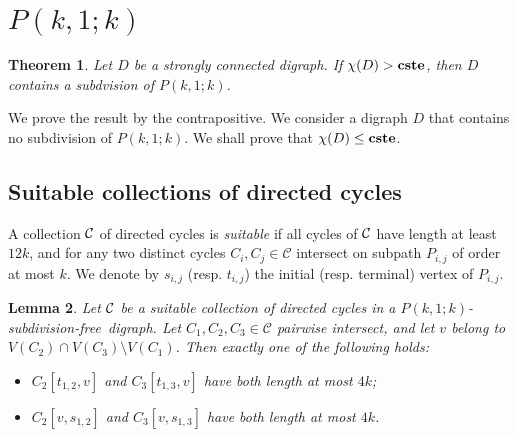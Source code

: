 \documentclass[utf8,10pt]{article}
\theoremstyle{plain}
\newtheorem{theorem}{Theorem}
\newtheorem{lemma}[theorem]{Lemma}
\theoremstyle{definition}
\theoremstyle{remark}
\newcommand{\cste}{\bf cste}
\newcommand{\free}{subdivision-free}
\begin{document}
\section{$P(k,1;k)$}

\begin{theorem}\label{th:main}
Let $D$ be a strongly connected digraph. If $\chi(D) > \cste$, then $D$ contains a subdvision of $P(k,1;k)$.
\end{theorem}


We prove the result by the contrapositive. We consider a digraph $D$ that contains no subdivision of $P(k,1;k)$.
We shall prove that $\chi(D) \leq \cste$.

\subsection{Suitable collections of directed cycles}
 
 A collection ${\cal C}$ of directed cycles is {\it suitable} if all cycles of ${\cal C}$ have length at least $12k$, and for
any two distinct cycles $C_i,C_j\in\mathcal C$ intersect on  subpath $P_{i,j}$ of order at most $k$.
We denote by $s_{i,j}$ (resp. $t_{i,j}$) the initial (resp. terminal) vertex of  $P_{i,j}$.
 
 
 
 \begin{lemma}\label{lem:dis}
 Let ${\cal C}$ be a suitable collection of directed cycles in a $P(k,1;k)$-\free\ digraph.
Let $C_1,C_2,C_3\in\mathcal C$ pairwise intersect, and let $v$ belong to $V(C_2)\cap V(C_3)\setminus V(C_1)$. Then exactly one of the following holds:
\begin{itemize}
\item $C_2[t_{1,2}, v]$ and $C_3[t_{1,3}, v]$ have both length at most $4k$; 
\item $C_2[v, s_{1,2}]$ and $C_3[v, s_{1,3}]$ have both length at most $4k$.
\end{itemize}
\end{lemma}
\end{document}
